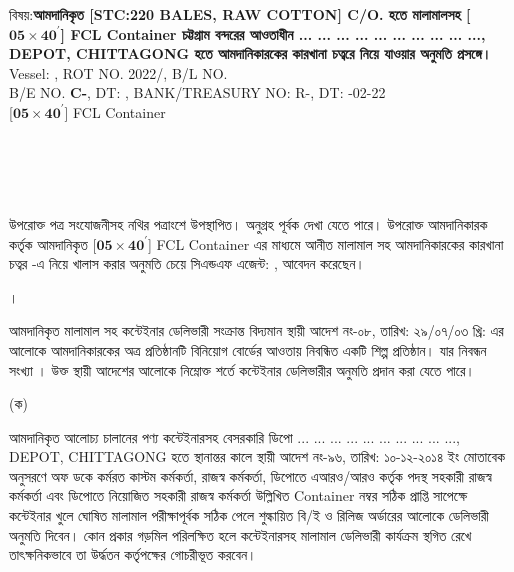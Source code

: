 \documentclass[12pt]{article}
\newcommand{\beno}{C-}
\newcommand{\bedt}{}
\newcommand{\rotno}{2022/}
\newcommand{\stc}{STC:220 BALES}
\newcommand{\co}{}
\newcommand{\vessel}{}
\newcommand{\good}{RAW COTTON}
\newcommand{\depo}{... ... ... ... ... ... ... ... ... ..., DEPOT, CHITTAGONG}
\newcommand{\blno}{}
\newcommand{\bldt}{}
\newcommand{\rno}{R-\hspace{10em}}
\newcommand{\rdt}{\hspace{2em}-02-22}
\newcommand{\impn}{}
\newcommand{\impadd}{}
\newcommand{\impreg}{}
\newcommand{\conno}{$\boldsymbol{05\times 40^\prime}$}
\newcommand{\conn}{] FCL Container}
\newcommand{\condf}{$\boldsymbol{\times 40^\prime}$}
\newcommand{\consh}{
\noindent{
\begin{tabular}{|l|l|l|l|l|}
\hline
\textbf{}{\condf}
&
\textbf{}{\condf}
&
\textbf{}{\condf}
&
\textbf{}{\condf}
&
\textbf{}{\condf}
\\
\hline
\end{tabular}
}
}
\begin{document}
\begin{minipage}[t]{0.96\linewidth}
বিষয়:\hspace{1em}\textbf{আমদানিকৃত
[{\stc}, {\good}]
C/O. {\co}
হতে মালামালসহ
[{\conno}{\conn}
চট্টগ্রাম বন্দরের আওতাধীন
{\depo} হতে
আমদানিকারকের কারখানা চত্বরে
নিয়ে যাওয়ার অনুমতি প্রসঙ্গে।}
\\
\footnotesize{Vessel: {\vessel},
ROT NO. {\rotno},
B/L NO. \textbf{{\blno}}{\bldt}
\\
B/E NO. \textbf{\beno},
DT: {\bedt},
BANK/TREASURY NO: {\rno},
DT: {\rdt}}
\\
\footnotesize{
[{\conno}{\conn}}
\\
\scriptsize{
{\consh}
}
\\
\footnotesize{
\framebox[1.02\width]{IMP:{\impn}}
\\
\framebox[1.02\width]{FACTORY:{\impadd}}
\\
}
\\
\end{minipage}
\begin{minipage}[t]{0.04\linewidth}
\hspace{0.0em}
\end{minipage}
\begin{minipage}[t]{0.96\linewidth}
\normalsize
উপরোক্ত পত্র সংযোজনীসহ নথির পত্রাংশে উপস্থাপিত।
অনুগ্রহ পূর্বক দেখা যেতে পারে।
উপরোক্ত আমদানিকারক কর্তৃক আমদানিকৃত
[{\conno}{\conn}
এর মাধ্যমে আনীত মালামাল সহ
আমদানিকারকের কারখানা চত্বর
{\impadd}-এ
নিয়ে খালাস করার অনুমতি চেয়ে
সিএন্ডএফ এজেন্ট: {\cnfn}, {\cnfadd}
আবেদন করেছেন।
\\
\end{minipage}
\footnotesize
\begin{minipage}[t]{0.04\linewidth}
।
\end{minipage}
\begin{minipage}[t]{0.96\linewidth}
আমদানিকৃত মালামাল সহ কন্টেইনার ডেলিভারী
সংক্রান্ত বিদ্যমান স্থায়ী আদেশ নং-০৮,
তারিখ: ২৯/০৭/০৩ খ্রি: এর আলোকে
আমদানিকারকের অত্র প্রতিষ্ঠানটি বিনিয়োগ
বোর্ডের আওতায় নিবন্ধিত একটি শিল্প
প্রতিষ্ঠান। যার নিবন্ধন সংখ্যা {\impreg}।
উক্ত স্থায়ী আদেশের আলোকে
নিম্নোক্ত শর্তে কন্টেইনার ডেলিভারীর
অনুমতি প্রদান করা যেতে পারে।
\\
\begin{minipage}[t]{0.04\linewidth}
(ক)
\end{minipage}
আমদানিকৃত আলোচ্য চালানের পণ্য
কন্টেইনারসহ বেসরকারি ডিপো
{\depo}
হতে স্থানান্তর কালে স্থায়ী
আদেশ নং-৯৬, তারিখ: ১০-১২-২০১৪ ইং
মোতাবেক অনুসরণে অফ ডকে
কর্মরত কাস্টম কর্মকর্তা, রাজস্ব কর্মকর্তা,
ডিপোতে এআরও/আরও কর্তৃক পদস্থ সহকারী রাজস্ব
কর্মকর্তা এবং ডিপোতে নিয়োজিত সহকারী
রাজস্ব কর্মকর্তা উল্লিখিত Container
নম্বর সঠিক প্রাপ্তি সাপেক্ষে কন্টেইনার খুলে
ঘোষিত মালামাল পরীক্ষাপূর্বক সঠিক পেলে শুল্কায়িত
বি/ই ও রিলিজ অর্ডারের আলোকে ডেলিভারী অনুমতি
দিবেন। কোন প্রকার গড়মিল পরিলক্ষিত হলে
কন্টেইনারসহ মালামাল ডেলিভারী কার্যক্রম স্থগিত রেখে
তাৎক্ষনিকভাবে তা উর্দ্ধতন কর্তৃপক্ষের গোচরীভূত করবেন।
\\
\end{minipage}
\end{document}
